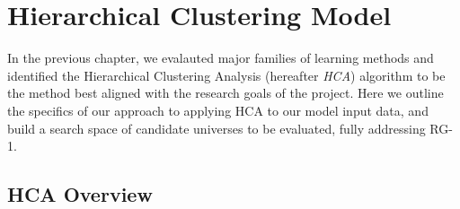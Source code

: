 \documentclass[../main.tex]{subfiles}
\begin{document}
\chapter{Hierarchical Clustering Model} \label{hierarchical_clustering_model}




In the previous chapter, we evalauted major families of learning methods and identified the Hierarchical Clustering Analysis (hereafter \textit{HCA}) algorithm to be the method best aligned with the research goals of the project. Here we outline the specifics of our approach to applying HCA to our model input data, and build a search space of candidate universes to be evaluated, fully addressing RG-1.

\section{HCA Overview}
\end{document}
